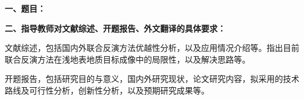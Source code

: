 {
    \setlength{\parindent}{0em}
    \par {\bfseries 一、题目：\Title}
    \\
    \par {\bfseries 二、指导教师对文献综述、开题报告、外文翻译的具体要求：}
}

文献综述，包括国内外联合反演方法优越性分析，以及应用情况介绍等。指出目前联合反演方法在浅地表地质目标成像中的局限性，以及解决思路等。

开题报告，包括研究目的与意义，国内外研究现状，论文研究内容，拟采用的技术路线及可行性分析，创新性分析，以及预期研究成果等。
\mbox{} \vfill

\signature{指导教师（签名）}
